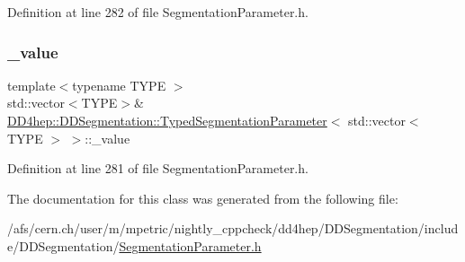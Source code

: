 Definition at line 282 of file Segmentation\+Parameter.\+h.

\hypertarget{class_d_d4hep_1_1_d_d_segmentation_1_1_typed_segmentation_parameter_3_01std_1_1vector_3_01_t_y_p_e_01_4_01_4_ac1ad16f1b2e4175cd7c428417fa8e038}{}\label{class_d_d4hep_1_1_d_d_segmentation_1_1_typed_segmentation_parameter_3_01std_1_1vector_3_01_t_y_p_e_01_4_01_4_ac1ad16f1b2e4175cd7c428417fa8e038} 
\subsubsection{\texorpdfstring{\+\_\+value}{\_value}}
{\footnotesize\ttfamily template$<$typename T\+Y\+PE $>$ \\
std\+::vector$<$T\+Y\+PE$>$\& \hyperlink{class_d_d4hep_1_1_d_d_segmentation_1_1_typed_segmentation_parameter}{D\+D4hep\+::\+D\+D\+Segmentation\+::\+Typed\+Segmentation\+Parameter}$<$ std\+::vector$<$ T\+Y\+PE $>$ $>$\+::\+\_\+value\hspace{0.3cm}{\ttfamily [protected]}}



Definition at line 281 of file Segmentation\+Parameter.\+h.



The documentation for this class was generated from the following file\+:\begin{DoxyCompactItemize}
\item 
/afs/cern.\+ch/user/m/mpetric/nightly\+\_\+cppcheck/dd4hep/\+D\+D\+Segmentation/include/\+D\+D\+Segmentation/\hyperlink{_segmentation_parameter_8h}{Segmentation\+Parameter.\+h}\end{DoxyCompactItemize}
